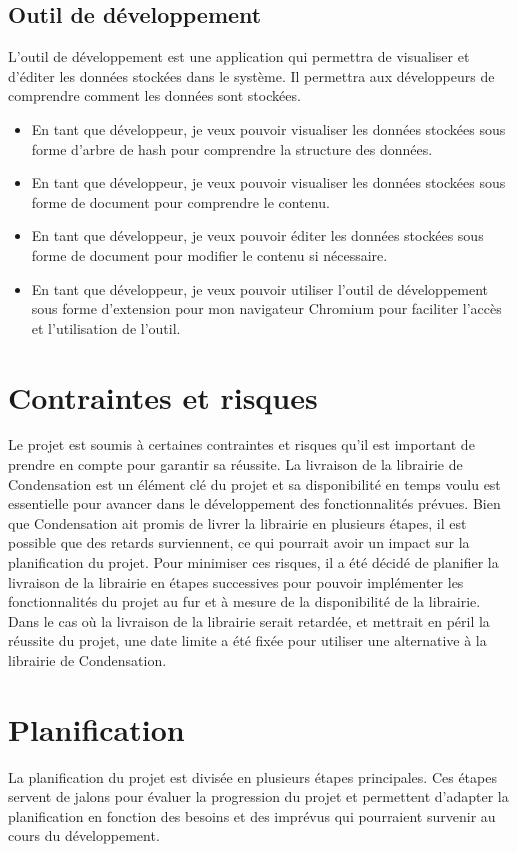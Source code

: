 \subsection*{Outil de développement \label{sec:user-stories-devtools}}

L'outil de développement est une application qui permettra de visualiser et d'éditer les données stockées dans le système. Il permettra aux développeurs de comprendre comment les données sont stockées.

\begin{itemize}
    \item En tant que développeur, je veux pouvoir visualiser les données stockées sous forme d'arbre de hash pour comprendre la structure des données.
    \item En tant que développeur, je veux pouvoir visualiser les données stockées sous forme de document pour comprendre le contenu.
    \item En tant que développeur, je veux pouvoir éditer les données stockées sous forme de document pour modifier le contenu si nécessaire.
    \item En tant que développeur, je veux pouvoir utiliser l'outil de développement sous forme d'extension pour mon navigateur Chromium pour faciliter l'accès et l'utilisation de l'outil.
\end{itemize}
\newpage
\section*{Contraintes et risques}
Le projet est soumis à certaines contraintes et risques qu'il est important de prendre en compte pour garantir sa réussite.
La livraison de la librairie de Condensation est un élément clé du projet et sa disponibilité en temps voulu est essentielle pour avancer dans le développement des fonctionnalités prévues. 
Bien que Condensation ait promis de livrer la librairie en plusieurs étapes, il est possible que des retards surviennent, ce qui pourrait avoir un impact sur la planification du projet.
Pour minimiser ces risques, il a été décidé de planifier la livraison de la librairie en étapes successives pour pouvoir implémenter les fonctionnalités du projet au fur et à mesure de la disponibilité de la librairie.
Dans le cas où la livraison de la librairie serait retardée, et mettrait en péril la réussite du projet, une date limite a été fixée pour utiliser une alternative à la librairie de Condensation.

\section*{Planification}
La planification du projet est divisée en plusieurs étapes principales. Ces étapes servent de jalons pour évaluer la progression du projet et permettent d'adapter la planification en fonction des besoins et des imprévus qui pourraient survenir au cours du développement.

